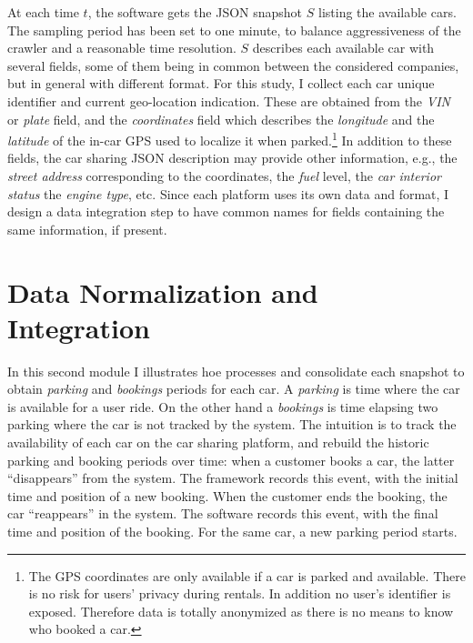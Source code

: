 At each time $t$, the software gets the JSON snapshot $S$ listing the available cars. 
The sampling period has been set to one minute, to balance aggressiveness of the crawler and a reasonable time resolution.
$S$ describes each available car with several fields, some of them being in common between the considered companies, but in general with different format.
For this study, I collect each car unique identifier and current geo-location indication.
These are obtained from the \textit{VIN} or \textit{plate} field, and the \textit{coordinates} field which describes the \textit{longitude} and the \textit{latitude} of the in-car GPS used to localize it when  parked.\footnote{The GPS coordinates are only available if a car is parked and available. There is no risk for users' privacy during rentals. In addition no user's identifier is exposed. Therefore data is totally anonymized as there is no means to know who booked a car.}
In addition to these fields, the car sharing JSON description may provide other information, e.g., the \textit{street address} corresponding to the coordinates, the \textit{fuel} level, the \textit{car interior status} the \textit{engine type}, etc. Since each platform uses its own data and format, I design a data integration step to have common names for fields containing the same information, if present.

\section{Data Normalization and Integration}
\label{sec:2_4_data_normalization}
In this second module I illustrates hoe \tool processes and consolidate each snapshot to obtain \emph{parking} and \emph{bookings} periods for each car. A \emph{parking} is time where the car is available for a user ride. On the other hand a \emph{bookings} is time elapsing two parking where the car is not tracked by the system. The intuition is to track the availability of each car on the car sharing platform, and rebuild the historic parking and booking periods over time: when a customer books a car, the latter ``disappears'' from the system. The framework records this event, with the initial time and position of a new booking. When the customer ends the booking, the car ``reappears'' in the system. The software records this event, with the final time and position of the booking. For the same car, a new parking period starts.


